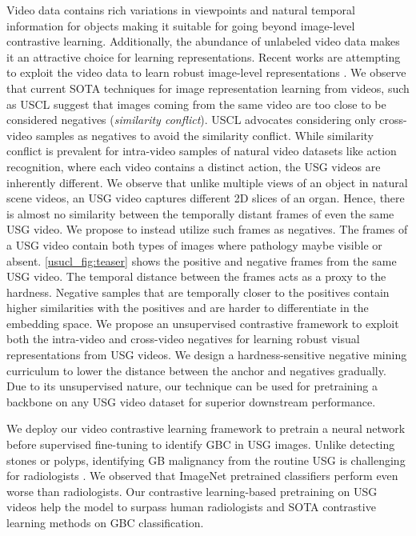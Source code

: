 Video data contains rich variations in viewpoints and natural temporal information for objects making it suitable for going beyond image-level contrastive learning. Additionally, the abundance of unlabeled video data makes it an attractive choice for learning representations. Recent works are attempting to exploit the video data to learn robust image-level representations \cite{uscl,cyclecontrast}. We observe that current SOTA techniques for image representation learning from videos, such as USCL \cite{uscl} suggest that images coming from the same video are too close to be considered negatives (\emph{similarity conflict}). USCL advocates considering only cross-video samples as negatives to avoid the similarity conflict. While similarity conflict is prevalent for intra-video samples of natural video datasets like action recognition, where each video contains a distinct action, the USG videos are inherently different. We observe that unlike multiple views of an object in natural scene videos, an USG video captures different 2D slices of an organ. Hence, there is almost no similarity between the temporally distant frames of even the same USG video. We propose to instead utilize such frames as negatives. The frames of a USG video contain both types of images where pathology maybe visible or absent. \cref{usucl_fig:teaser} shows the positive and negative frames from the same USG video. The temporal distance between the frames acts as a proxy to the hardness. Negative samples that are temporally closer to the positives contain higher similarities with the positives and are harder to differentiate in the embedding space. We propose an unsupervised contrastive framework to exploit both the intra-video and cross-video negatives for learning robust visual representations from USG videos. We design a hardness-sensitive negative mining curriculum to lower the distance between the anchor and negatives gradually. Due to its unsupervised nature, our technique can be used for pretraining a backbone on any USG video dataset for superior downstream performance.

We deploy our video contrastive learning framework to pretrain a neural network before supervised fine-tuning to identify GBC in USG images. 
Unlike detecting stones or polyps, identifying GB malignancy from the routine USG is challenging for radiologists \cite{gb-rads-paper,gupta2020imaging}. We observed that ImageNet pretrained classifiers perform even worse than radiologists. 
Our contrastive learning-based pretraining on USG videos help the model to surpass human radiologists and SOTA contrastive learning methods on GBC classification.

